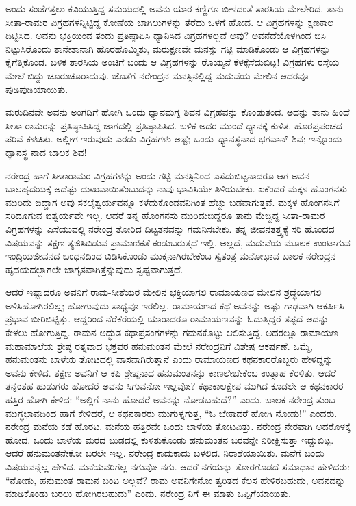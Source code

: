 ಅಂದು ಸಂಜೆಗತ್ತಲು ಕವಿಯುತ್ತಿದ್ದ ಸಮಯದಲ್ಲಿ ಅವನು ಯಾರ ಕಣ್ಣಿಗೂ ಬೀಳದಂತೆ ತಾರಸಿಯ ಮೇಲೇರಿದ. ತಾನು ಸೀತಾ-ರಾಮರ ವಿಗ್ರಹಗಳನ್ನಿಟ್ಟಿದ್ದ ಕೋಣೆಯ ಬಾಗಿಲುಗಳನ್ನು ತೆರೆದು ಒಳಗೆ ಹೋದ. ಆ ವಿಗ್ರಹಗಳನ್ನು ಕ್ಷಣಕಾಲ ದಿಟ್ಟಿಸಿದ. ಅವನು ಭಕ್ತಿಯಿಂದ ತಂದು ಪ್ರತಿಷ್ಠಾಪಿಸಿ ಧ್ಯಾನಿಸಿದ ವಿಗ್ರಹಗಳಲ್ಲವೆ ಅವು? ಅವನೆದೆಯೊಳಗಿಂದ ಬಿಸಿ ನಿಟ್ಟುಸಿರೊಂದು ತಾನೇತಾನಾಗಿ ಹೊರಹೊಮ್ಮಿತು, ಮರುಕ್ಷಣವೇ ಮನಸ್ಸು ಗಟ್ಟಿ ಮಾಡಿಕೊಂಡು ಆ ವಿಗ್ರಹಗಳನ್ನು ಕೈಗೆತ್ತಿಕೊಂಡ. ಬಳಿಕ ತಾರಸಿಯ ಅಂಚಿಗೆ ಬಂದು ಆ ವಿಗ್ರಹಗಳನ್ನು ರೊಯ್ಯನೆ ಕೆಳಕ್ಕೆಸೆದುಬಿಟ್ಟ! ವಿಗ್ರಹಗಳು ರಸ್ತೆಯ ಮೇಲೆ ಬಿದ್ದು ಚೂರುಚೂರಾದುವು. ಜೊತೆಗೆ ನರೇಂದ್ರನ ಮನಸ್ಸಿನಲ್ಲಿದ್ದ ಮದುವೆಯ ಮೇಲಿನ ಆದರವೂ ಪುಡಿಪುಡಿಯಾಯಿತು.

ಮರುದಿನವೇ ಅವನು ಅಂಗಡಿಗೆ ಹೋಗಿ ಒಂದು ಧ್ಯಾನಮಗ್ನ ಶಿವನ ವಿಗ್ರಹವನ್ನು ಕೊಂಡುತಂದ. ಅದನ್ನು ತಾನು ಹಿಂದೆ ಸೀತಾ-ರಾಮರನ್ನು ಪ್ರತಿಷ್ಠಾಪಿಸಿದ್ದ ಜಾಗದಲ್ಲಿ ಪ್ರತಿಷ್ಠಾಪಿಸಿದ. ಬಳಿಕ ಅದರ ಮುಂದೆ ಧ್ಯಾನಕ್ಕೆ ಕುಳಿತ. ಹೊರಪ್ರಪಂಚದ ಪರಿವೆ ಕಳಚಿತು. ಅಲ್ಲೀಗ ಇರುವುದು ಎರಡು ವಿಗ್ರಹಗಳು ಅಷ್ಟೆ; ಒಂದು–ಧ್ಯಾನಸ್ಥನಾದ ಭಗವಾನ್ ಶಿವ; ಇನ್ನೊಂದು–ಧ್ಯಾನಸ್ಥ ನಾದ ಬಾಲಕ ಶಿವ!

ನರೇಂದ್ರ ಹಾಗೆ ಸೀತಾರಾಮರ ವಿಗ್ರಹಗಳನ್ನು ಅಂದು ಗಟ್ಟಿ ಮನಸ್ಸಿನಿಂದ ಎಸೆದುಬಿಟ್ಟನಾದರೂ ಆಗ ಅವನ ಬಾಲಹೃದಯಕ್ಕೆ ಅದೆಷ್ಟು ದುಃಖವಾಯಿತೆಂಬುದನ್ನು ನಾವು ಭಾವಿಸಿಯೇ ತಿಳಿಯಬೇಕು. ಏಕೆಂದರೆ ಮಕ್ಕಳ ಹೊಂಗನಸು ಮುರಿದು ಬಿದ್ದಾಗ ಅವು ಸಕಲೈಶ್ವರ್ಯವನ್ನೂ ಕಳೆದುಕೊಂಡವನಿಗಿಂತ ಹೆಚ್ಚು ಬಡವಾಗುತ್ತವೆ. ಮಕ್ಕಳ ಹೊಂಗನಸಿಗೆ ಸರಿದೂಗುವ ಐಶ್ವರ್ಯವೇ ಇಲ್ಲ. ಆದರೆ ತನ್ನ ಹೊಂಗನಸು ಮುರಿದುಬಿದ್ದರೂ ತಾನು ಮೆಚ್ಚಿದ್ದ ಸೀತಾ-ರಾಮರ ವಿಗ್ರಹಗಳನ್ನು ಎಸೆಯುವಲ್ಲಿ ನರೇಂದ್ರ ತೋರಿದ ದಿಟ್ಟತನವನ್ನು ಗಮನಿಸಬೇಕು. ತನ್ನ ಜೀವನತತ್ತ್ವಕ್ಕೆ ಸರಿ ಹೊಂದದ ವಿಷಯವನ್ನು ತಕ್ಷಣ ತ್ಯಜಿಸಿಬಿಡುವ ಪ್ರಾಮಾಣಿಕತೆ ಕಂಡುಬರುತ್ತದೆ ಇಲ್ಲಿ. ಅಲ್ಲದೆ, ಮದುವೆಯ ಮೂಲಕ ಉಂಟಾಗುವ ಇಂದ್ರಿಯಜೀವನದ ಬಂಧನದಿಂದ ಬಿಡಿಸಿಕೊಂಡು ಮುಕ್ತನಾಗಿರಬೇಕೆಂಬ ಸ್ವತಂತ್ರ ಮನೋಭಾವ ಬಾಲಕ ನರೇಂದ್ರನ ಹೃದಯದಲ್ಲಾಗಲೇ ಜಾಗೃತವಾಗಿತ್ತೆನ್ನುವುದು ಸ್ವಷ್ಟವಾಗುತ್ತದೆ.

ಆದರೆ ಇಷ್ಟಾದರೂ ಅವನಿಗೆ ರಾಮ-ಸೀತೆಯರ ಮೇಲಿನ ಭಕ್ತಿಯಾಗಲಿ ರಾಮಾಯಣದ ಮೇಲಿನ ಶ್ರದ್ಧೆಯಾಗಲಿ ಅಳಿಸಿಹೋಗಿರಲಿಲ್ಲ; ಹೋಗುವುದು ಸಾಧ್ಯವೂ ಇರಲಿಲ್ಲ. ರಾಮಾಯಣದ ಕಥೆ ಅವನನ್ನು ಅಷ್ಟು ಗಾಢವಾಗಿ ಆಕರ್ಷಿಸಿ ಪ್ರಭಾವ ಬೀರಿಬಿಟ್ಟಿತ್ತು. ಆದ್ದರಿಂದ ನೆರೆಕೆರೆಯಲ್ಲಿ ಯಾರಾದರೂ ರಾಮಾಯಣವನ್ನು ಓದುತ್ತಿದ್ದರೆ ತಪ್ಪದೆ ಅದನ್ನು ಕೇಳಲು ಹೋಗುತ್ತಿದ್ದ. ರಾಮನ ಅದ್ಭುತ ಕಥಾಪ್ರಸಂಗಗಳನ್ನು ಗಮನಕೊಟ್ಟು ಆಲಿಸುತ್ತಿದ್ದ. ಅದರಲ್ಲೂ ರಾಮಾಯಣ ಮಹಾಮಾಲೆಯ ಶ್ರೇಷ್ಠ ರತ್ನವಾದ ಭಕ್ತವರ ಹನುಮಂತನ ಮೇಲೆ ನರೇಂದ್ರನಿಗೆ ವಿಶೇಷ ಆಕರ್ಷಣೆ. ಒಮ್ಮೆ, ಹನುಮಂತನು ಬಾಳೆಯ ತೋಟದಲ್ಲಿ ವಾಸವಾಗಿರುತ್ತಾನೆ ಎಂದು ರಾಮಾಯಣದ ಕಥನಕಾರರೊಬ್ಬರು ಹೇಳಿದ್ದನ್ನು ಅವನು ಕೇಳಿದ. ತಕ್ಷಣ ಅವನಿಗೆ ಆ ಕಪಿ ಶ್ರೇಷ್ಠನಾದ ಹನುಮಂತನನ್ನು ಕಾಣಲೇಬೇಕೆಂಬ ಉತ್ಸಾಹ ಕೆರಳಿತು. ಆದರೆ ತನ್ನಂತಹ ಹುಡುಗರು ಹೋದರೆ ಅವನು ಸಿಗುವನೋ ಇಲ್ಲವೋ? ಕಥಾಕಾಲಕ್ಷೇಪ ಮುಗಿದ ಕೂಡಲೇ ಆ ಕಥನಕಾರರ ಹತ್ತಿರ ಹೋಗಿ ಕೇಳಿದ: “ಅಲ್ಲಿಗೆ ನಾನು ಹೋದರೆ ಅವನನ್ನು ನೋಡಬಹುದೆ?” ಎಂದು. ಬಾಲಕ ನರೇಂದ್ರ ತುಂಬ ಮುಗ್ಧಭಾವದಿಂದ ಹಾಗೆ ಕೇಳಿದರೆ, ಆ ಕಥನಕಾರರು ಮುಗುಳ್ನಗುತ್ತ, “ಓ ಬೇಕಾದರೆ ಹೋಗಿ ನೋಡು!” ಎಂದರು. ನರೇಂದ್ರ ಮನೆಯ ಕಡೆ ಹೊರಟ. ಮನೆಯ ಹತ್ತಿರವೇ ಒಂದು ಬಾಳೆಯ ತೋಟವಿತ್ತು. ನರೇಂದ್ರ ನೇರವಾಗಿ ಅದರೊಳಕ್ಕೆ ಹೋದ. ಒಂದು ಬಾಳೆಯ ಮರದ ಬುಡದಲ್ಲಿ ಕುಳಿತುಕೊಂಡು ಹನುಮಂತನ ಬರವನ್ನೇ ನಿರೀಕ್ಷಿಸುತ್ತಾ ಇದ್ದುಬಿಟ್ಟ. ಆದರೆ ಹನುಮಂತನೇಕೋ ಬರಲೇ ಇಲ್ಲ. ನರೇಂದ್ರ ಕಾದುಕಾದು ಬಳಲಿದ. ನಿರಾಶೆಯಾಯಿತು. ಮನೆಗೆ ಬಂದು ವಿಷಯವನ್ನೆಲ್ಲ ಹೇಳಿದ. ಮನೆಯವರಿಗೆಲ್ಲ ನಗುವೋ ನಗು. ಆದರೆ ನಗೆಯನ್ನು ತೋರಗೊಡದೆ ಸಮಾಧಾನ ಹೇಳಿದರು: “ನೋಡು, ಹನುಮಂತ ರಾಮನ ಬಂಟ ಅಲ್ಲವೆ? ರಾಮ ಅವನಿಗೇನೋ ತ್ವರಿತದ ಕೆಲಸ ಹೇಳಿರಬಹುದು, ಅವನದನ್ನು ಮಾಡಿಕೊಂಡು ಬರಲು ಹೋಗಿರಬಹುದು” ಎಂದು. ನರೇಂದ್ರ ನಿಗೆ ಈ ಮಾತು ಒಪ್ಪಿಗೆಯಾಯಿತು.

